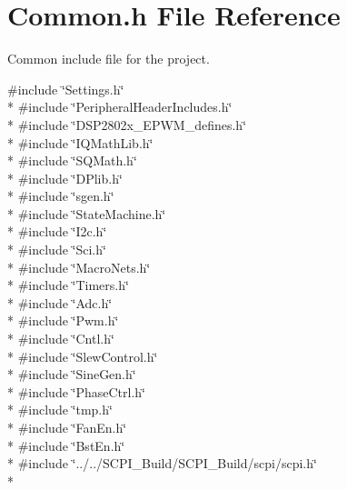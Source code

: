 \hypertarget{a00009}{\section{Common.\-h File Reference}
\label{a00009}
}


Common include file for the project.  


{\ttfamily \#include \char`\"{}Settings.\-h\char`\"{}}\\*
{\ttfamily \#include \char`\"{}Peripheral\-Header\-Includes.\-h\char`\"{}}\\*
{\ttfamily \#include \char`\"{}D\-S\-P2802x\-\_\-\-E\-P\-W\-M\-\_\-defines.\-h\char`\"{}}\\*
{\ttfamily \#include \char`\"{}I\-Q\-Math\-Lib.\-h\char`\"{}}\\*
{\ttfamily \#include \char`\"{}S\-Q\-Math.\-h\char`\"{}}\\*
{\ttfamily \#include \char`\"{}D\-Plib.\-h\char`\"{}}\\*
{\ttfamily \#include \char`\"{}sgen.\-h\char`\"{}}\\*
{\ttfamily \#include \char`\"{}State\-Machine.\-h\char`\"{}}\\*
{\ttfamily \#include \char`\"{}I2c.\-h\char`\"{}}\\*
{\ttfamily \#include \char`\"{}Sci.\-h\char`\"{}}\\*
{\ttfamily \#include \char`\"{}Macro\-Nets.\-h\char`\"{}}\\*
{\ttfamily \#include \char`\"{}Timers.\-h\char`\"{}}\\*
{\ttfamily \#include \char`\"{}Adc.\-h\char`\"{}}\\*
{\ttfamily \#include \char`\"{}Pwm.\-h\char`\"{}}\\*
{\ttfamily \#include \char`\"{}Cntl.\-h\char`\"{}}\\*
{\ttfamily \#include \char`\"{}Slew\-Control.\-h\char`\"{}}\\*
{\ttfamily \#include \char`\"{}Sine\-Gen.\-h\char`\"{}}\\*
{\ttfamily \#include \char`\"{}Phase\-Ctrl.\-h\char`\"{}}\\*
{\ttfamily \#include \char`\"{}tmp.\-h\char`\"{}}\\*
{\ttfamily \#include \char`\"{}Fan\-En.\-h\char`\"{}}\\*
{\ttfamily \#include \char`\"{}Bst\-En.\-h\char`\"{}}\\*
{\ttfamily \#include \char`\"{}../../\-S\-C\-P\-I\-\_\-\-Build/\-S\-C\-P\-I\-\_\-\-Build/scpi/scpi.\-h\char`\"{}}\\*
